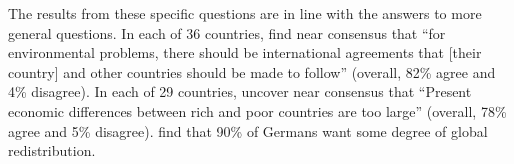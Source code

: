 The results from these specific questions are in line with the answers to more general questions. In each of 36 countries, \citet{issp_international_2010} find near consensus that ``for environmental problems, there should be international agreements that [their country] and other countries should be made to follow'' (overall, 82\% agree and 4\% disagree). %
In each of 29 countries, \citet{issp_international_2019} uncover near consensus that ``Present economic differences between rich and poor countries are too large'' (overall, 78\% agree and 5\% disagree). \citet{fehr_your_2022} find that 90\% of Germans want some degree of global redistribution. %

